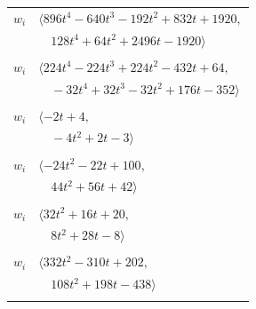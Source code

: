 \documentclass[11pt]{article}
\begin{document}
\begin{longtable}{@{}ll@{}}
$w_i$ & $\langle 896t^{4}-640t^{3}-192t^{2}+832t+1920,$\\
 & $\quad 128t^{4}+64t^{2}+2496t-1920\rangle$\\
\addlinespace[2pt]
\multicolumn{2}{@{}p{0.97\textwidth}@{}}{$i=9$, $D_i=1$, $e_i=2$, $\rho_{ij}$: $6{:}1, \allowbreak 13{:}2, \allowbreak 15{:}3, \allowbreak 32{:}1, \allowbreak 36{:}3, \allowbreak 53{:}3, \allowbreak 54{:}2, \allowbreak 56{:}3, \allowbreak 67{:}2$}\\
$w_i$ & $\langle 224t^{4}-224t^{3}+224t^{2}-432t+64,$\\
 & $\quad -32t^{4}+32t^{3}-32t^{2}+176t-352\rangle$\\
\addlinespace[2pt]
\multicolumn{2}{@{}p{0.97\textwidth}@{}}{$i=10$, $D_i=1$, $\rho_{ij}$: $22{:}2, \allowbreak 40{:}2, \allowbreak 42{:}2, \allowbreak 64{:}2$}\\
$w_i$ & $\langle -2t+4,$\\
 & $\quad -4t^{2}+2t-3\rangle$\\
\addlinespace[2pt]
\multicolumn{2}{@{}p{0.97\textwidth}@{}}{$i=11$, $D_i=1$, $\rho_{ij}$: $17{:}1, \allowbreak 20{:}2, \allowbreak 31{:}1, \allowbreak 40{:}3, \allowbreak 46{:}1, \allowbreak 49{:}1, \allowbreak 50{:}3, \allowbreak 53{:}1, \allowbreak 56{:}3, \allowbreak 57{:}1$}\\
$w_i$ & $\langle -24t^{2}-22t+100,$\\
 & $\quad 44t^{2}+56t+42\rangle$\\
\addlinespace[2pt]
\multicolumn{2}{@{}p{0.97\textwidth}@{}}{$i=12$, $D_i=1$, $\rho_{ij}$: $23{:}2, \allowbreak 31{:}3, \allowbreak 32{:}1, \allowbreak 37{:}3, \allowbreak 42{:}1, \allowbreak 54{:}1, \allowbreak 60{:}2, \allowbreak 68{:}3, \allowbreak 70{:}1$}\\
$w_i$ & $\langle 32t^{2}+16t+20,$\\
 & $\quad 8t^{2}+28t-8\rangle$\\
\addlinespace[2pt]
\multicolumn{2}{@{}p{0.97\textwidth}@{}}{$i=13$, $D_i=1$, $\rho_{ij}$: $8{:}2, \allowbreak 9{:}2, \allowbreak 27{:}1, \allowbreak 30{:}2, \allowbreak 36{:}3, \allowbreak 40{:}1, \allowbreak 41{:}3, \allowbreak 43{:}2, \allowbreak 47{:}1, \allowbreak 51{:}1, \allowbreak 56{:}3, \allowbreak 57{:}1, \allowbreak 59{:}3, \allowbreak 74{:}3$}\\
$w_i$ & $\langle 332t^{2}-310t+202,$\\
 & $\quad 108t^{2}+198t-438\rangle$\\
\addlinespace[2pt]
\multicolumn{2}{@{}p{0.97\textwidth}@{}}{$i=14$, $D_i=128$, $e_i=2$, $\rho_{ij}$: $22{:}1, \allowbreak 23{:}1, \allowbreak 24{:}3, \allowbreak 26{:}3, \allowbreak 32{:}1, \allowbreak 42{:}3, \allowbreak 45{:}3, \allowbreak 46{:}1, \allowbreak 48{:}3, \allowbreak 51{:}3, \allowbreak 52{:}3, \allowbreak 54{:}3, \allowbreak 64{:}1, \allowbreak 65{:}2, \allowbreak 68{:}3, \allowbreak 73{:}3$}\\

\end{longtable}
\end{document}
